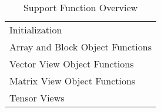 \begin{table}[H]
\caption{Support Function Overview}
\label{tab:vsiplAPISupport}
\begin{center}
\begin{tabular}{l}
Initialization\\
Array and Block Object Functions\\
Vector View Object Functions\\
Matrix View Object Functions\\
Tensor Views\\
\end{tabular}
\end{center}
\label{default}
\end{table}%